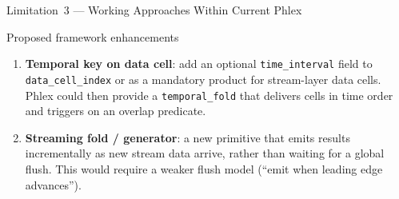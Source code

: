 \documentclass[aspectratio=169,10pt]{beamer}
\newcommand{\code}[1]{\texttt{\small #1}}
\begin{document}
\begin{frame}{Limitation~3 --- Working Approaches Within Current Phlex}
  \medskip
  \begin{exampleblock}{Proposed framework enhancements}
    \small
    \begin{enumerate}
      \item \textbf{Temporal key on data cell}: add an optional
            \code{time\_interval} field to \code{data\_cell\_index} or
            as a mandatory product for stream-layer data cells.
            Phlex could then provide a \code{temporal\_fold} that
            delivers cells in time order and triggers on an overlap
            predicate.
      \item \textbf{Streaming fold / generator}: a new primitive that
            emits results incrementally as new stream data arrive,
            rather than waiting for a global flush.  This would require
            a weaker flush model (``emit when leading edge advances'').
    \end{enumerate}
  \end{exampleblock}
\end{frame}

\end{document}
